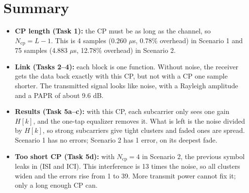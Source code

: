 \documentclass[11pt,a4paper]{article}
\newcommand{\Ncp}{N_{\mathrm{cp}}}
\begin{document}
\section{Summary}

\begin{itemize}
  \item \textbf{CP length (Task 1):} the CP must be as long as the channel, so $\Ncp = L - 1$. This is
        4 samples (0.260 $\mu$s, 0.78\% overhead) in Scenario 1 and 75 samples (4.883 $\mu$s, 12.78\%
        overhead) in Scenario 2.
  \item \textbf{Link (Tasks 2--4):} each block is one function. Without noise, the receiver gets the data
        back exactly with this CP, but not with a CP one sample shorter. The transmitted signal looks like
        noise, with a Rayleigh amplitude and a PAPR of about 9.6 dB.
  \item \textbf{Results (Task 5a--c):} with this CP, each subcarrier only sees one gain $H[k]$, and the
        one-tap equalizer removes it. What is left is the noise divided by $H[k]$, so strong subcarriers
        give tight clusters and faded ones are spread. Scenario 1 has no errors; Scenario 2 has 1 error,
        on its deepest fade.
  \item \textbf{Too short CP (Task 5d):} with $\Ncp = 4$ in Scenario 2, the previous symbol leaks in
        (ISI and ICI). This interference is 13 times the noise, so all clusters widen and the errors rise
        from 1 to 39. More transmit power cannot fix it; only a long enough CP can.
\end{itemize}
\end{document}
